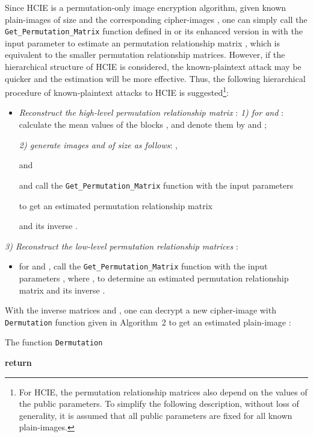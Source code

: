 \documentclass[final,3p,times,twocolumn]{elsarticle}
\begin{document}
Since HCIE is a permutation-only image encryption algorithm, given  known
plain-images  of size  and the
corresponding cipher-images , one can simply call
the \texttt{Get\_Permutation\_Matrix} function defined in \cite[Sec.~3.1]{Li:Permutation:SPIC2008} or its enhanced version in
\cite[Sec.~4]{Lcq:Optimal:SP11} with the input parameter  to estimate an
 permutation relationship matrix , which is equivalent to
the  smaller
permutation relationship matrices. However, if the hierarchical structure of
HCIE is considered, the known-plaintext attack may be quicker and
the estimation will be more effective. Thus, the following hierarchical procedure of
known-plaintext attacks to HCIE is suggested\footnote{For HCIE,
the permutation relationship matrices also depend on the values of the public
parameters. To simplify the following description, without loss of
generality, it is assumed that all public parameters are fixed for
all known plain-images.}:
\begin{itemize}
\item \textit{Reconstruct the high-level permutation relationship matrix
}: \textit{1)  for  and
}: calculate the mean values of the  blocks ,
 and denote them by
 and
;

\textit{2) generate  images  and  of size  as
follows}: ,

and

and call the \texttt{Get\_Permutation\_Matrix} function with the
input parameters

to get an estimated permutation relationship matrix

and its inverse
.
\end{itemize}

\textit{3) \textit{Reconstruct the
 low-level
permutation relationship matrices
}}:
\begin{itemize}
\item for  and
, call the
\texttt{Get\_Permutation\_Matrix} function with the input
parameters , where , to
determine an estimated permutation relationship matrix
 and its inverse
.
\end{itemize}

With the  inverse
matrices  and
,
one can decrypt a new cipher-image  with \texttt{Dermutation} function
given in Algorithm~2 to get an estimated plain-image :
\begin{algorithm}
\caption{The function \texttt{Dermutation}}
\begin{algorithmic}[1]
\For{}
  \For {}
     \State 
        \For{}
           \For{  }
              \State 
              \State 
            \EndFor
      \EndFor
  \EndFor
\EndFor
\State \textbf{return} 
\EndFunction
\end{algorithmic}
\end{algorithm}
\end{document}
